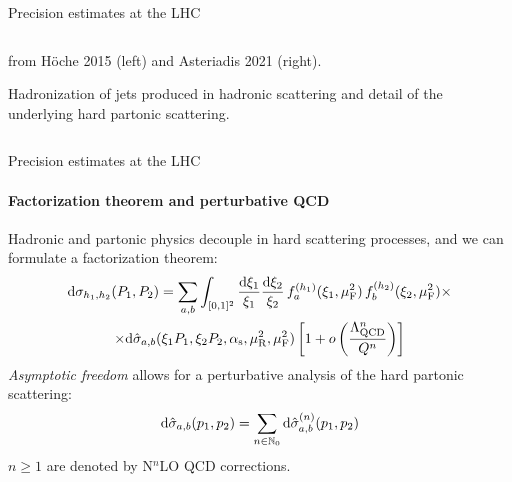\begin{frame}{Precision estimates at the LHC}
\begin{columns}
\begin{column}{0.5 \textwidth}
       from Höche 2015 (left) and Asteriadis 2021 (right).

      \justifying
      Hadronization of jets produced in hadronic scattering and detail of the underlying hard partonic scattering.

    \end{column}

  \end{columns}

\end{frame}


\begin{frame}{Precision estimates at the LHC}
  \framesubtitle{Factorization theorem and perturbative QCD}

  \justifying
  Hadronic and partonic physics decouple in hard scattering processes, and we can formulate a factorization theorem:
  \begin{multline*}
    \mathrm{d}\sigma_{h_1 , h_2}(P_1 , P_2) = \sum_{a,b} \int_{[0,1]^2} \frac{\mathrm{d} \xi_1}{\xi_1} \frac{\mathrm{d} \xi_2}{\xi_2} \,f_{a}^{(h_1)}(\xi_1, \mu_\text{F}^2) \,f_{b}^{(h_2)}(\xi_2, \mu_\text{F}^2) \times \\
    \times \mathrm{d}\hat{\sigma}_{a,b}(\xi_1 P_1, \xi_2 P_2, \alpha_\text{s}, \mu_\text{R}^2, \mu_\text{F}^2)
    \left[ 1 + o \left( \frac{\Lambda_\text{QCD}^n}{Q^n} \right) \right]
  \end{multline*}
  \emph{Asymptotic freedom} allows for a perturbative analysis of the hard partonic scattering:
  \begin{equation*}
    \mathrm{d}\hat{\sigma}_{a,b}(p_1 , p_2) = \sum_{n \in \mathbb{N}_0} \mathrm{d}\hat{\sigma}_{a,b}^{(n)}(p_1 , p_2)
  \end{equation*}
  $ n \ge 1 $ are denoted by N$ ^n $LO QCD corrections.

\end{frame}


